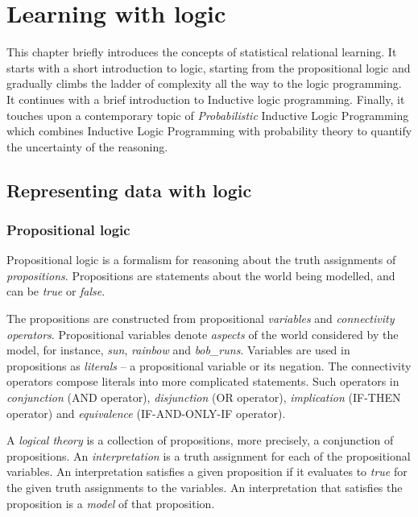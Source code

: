 \chapter{Learning with logic}\label{ch:learninglogic}



This chapter briefly introduces the concepts of statistical relational learning.
It starts with a short introduction to logic, starting from the propositional logic and gradually climbs the ladder of complexity all the way to the logic programming.
It continues with a brief introduction to Inductive logic programming.
Finally, it touches upon a contemporary topic of \textit{Probabilistic} Inductive Logic Programming which combines Inductive Logic Programming  with probability theory to quantify the uncertainty of the reasoning.




\section{Representing data with logic}





\subsection{Propositional logic}

Propositional logic is a formalism for reasoning about the truth assignments of \textit{propositions}.
Propositions are statements about the world being modelled, and can be \textit{true} or \textit{false}.


The propositions are constructed from propositional \textit{variables} and \textit{connectivity operators}.
Propositional variables denote \textit{aspects} of the world considered by the model, for instance, \textit{sun}, \textit{rainbow} and \textit{bob\_runs}.
Variables are used in propositions as \textit{literals} -- a propositional variable or its negation.
The connectivity operators compose literals into more complicated statements.
Such operators in \textit{conjunction} (AND operator), \textit{disjunction} (OR operator), \textit{implication} (IF-THEN operator) and \textit{equivalence} (IF-AND-ONLY-IF	operator).


A \textit{logical theory} is a collection of propositions, more precisely, a conjunction of propositions.
An \textit{interpretation} is a truth assignment for each of the propositional variables.
An interpretation satisfies a given proposition if it evaluates to \textit{true} for the given truth assignments to the variables.
An interpretation that satisfies the proposition is a \textit{model} of that proposition.



